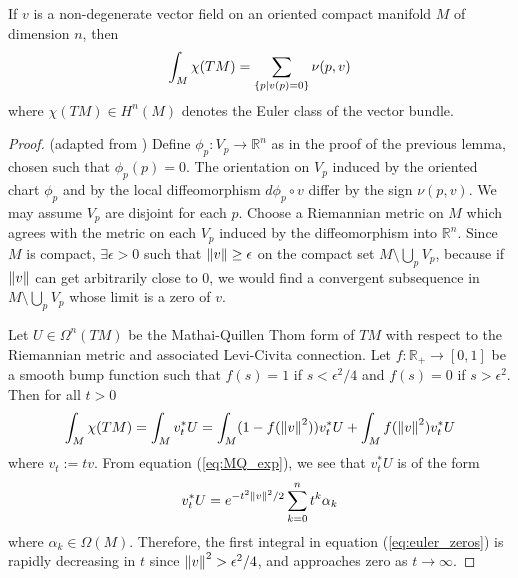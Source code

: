 \begin{thm} %
	If $v$ is a non-degenerate vector field on an oriented compact manifold $M$ 
	of dimension $n$, then 
	\[
		 \int_M \chi(TM) = \sum_{\set{p|v(p)=0}} \nu(p,v)	
	\] 
	where $\chi(TM)\in H^n(M)$ denotes the Euler class of the vector bundle.
\end{thm}
\begin{proof}
	(adapted from \cite[Theorem 1.56]{bgv})
	Define $\phi_p : V_p \to \mathbb{R}^n$ as in the proof of the previous
	lemma, chosen such that $\phi_p(p) = 0$. 
	The orientation on $V_p$ induced by the oriented chart $\phi_p$ and by 
	the local diffeomorphism $d\phi_p \circ v$ differ by the sign $\nu(p,v)$. 
	We may assume $V_p$ are disjoint for each $p$.  
	Choose a Riemannian metric
	on $M$ which agrees with the metric on each $V_p$ induced by the diffeomorphism
	into  $\mathbb{R}^n$. Since $M$ is compact,  $\exists \epsilon > 0$ such
	that  $\norm{v} \geq \epsilon$ on the compact set  $M\setminus \bigcup_p V_p$,
	because if $\norm{v}$ can get arbitrarily close to 0, we would find a convergent
	subsequence in $M\setminus \bigcup_p V_p$ whose limit is a zero of $v$.  

	Let $U\in \Omega^n(TM)$ be the Mathai-Quillen Thom form of  $TM$ with respect to the
	Riemannian metric and associated Levi-Civita connection. 
	Let $f : \mathbb{R}_+ \to [0,1]$ be a smooth bump function such that $f(s)=1$
	if  $s < \epsilon^2 /4$ and $f(s)=0$ if  $s>\epsilon^2$. Then for all $t>0$
	\begin{equation} \label{eq:euler_zeros}
			\int_M \chi(TM) = \int_M v_t^* U 
		= \int_M (1-f(\norm{v}^2))v_t^*U  + \int_M f(\norm{v}^2)v_t^*U
	\end{equation}
	where $v_t := tv$. From equation (\ref{eq:MQ_exp}), we see that
	$v_t^* U$ is of the form
	\[
		v_t^*U = e^{-t^2\norm{v}^2 /2} \sum_{k=0}^{n} t^k \alpha_k
	\] 
	where $\alpha_k \in \Omega(M)$. Therefore, the first integral in equation
	(\ref{eq:euler_zeros}) is rapidly decreasing in $t$ since $\norm{v}^2 >
	\epsilon^2 /4$, and approaches zero as $t\to\infty$.


\end{proof}
